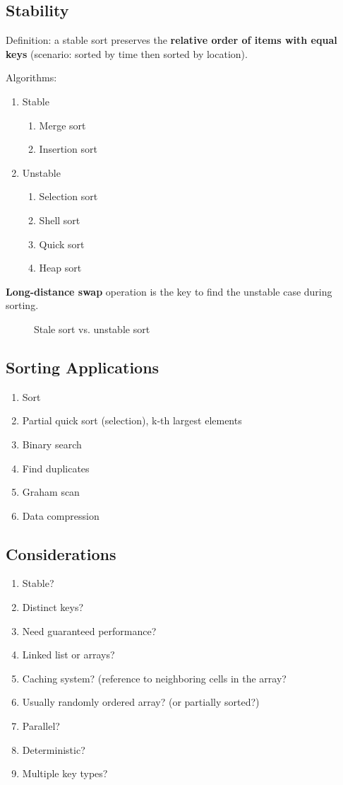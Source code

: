 \subsection{Stability}
Definition: a stable sort preserves the \textbf{relative order of items with equal keys} (scenario: sorted by time then sorted by location). 

Algorithms:
\begin{enumerate}
\item Stable
\begin{enumerate}
\item Merge sort
\item Insertion sort
\end{enumerate} 
\item Unstable
\begin{enumerate}
\item Selection sort
\item Shell sort
\item Quick sort
\item Heap sort
\end{enumerate}
\end{enumerate}
\textbf{Long-distance swap} operation is the key to find the unstable case during sorting. 
\begin{figure}[hbtp]
\centering
{}
\caption{Stale sort vs. unstable sort}
\label{fig:trie} 
\end{figure}

\subsection{Sorting Applications}
\begin{enumerate}
\item Sort
\item Partial quick sort (selection), k-th largest elements 
\item Binary search
\item Find duplicates 
\item Graham scan
\item Data compression
\end{enumerate}

\subsection{Considerations}
\begin{enumerate}
\item Stable?
\item Distinct keys?
\item Need guaranteed performance?
\item Linked list or arrays?
\item Caching system? (reference to neighboring cells in the array? 
\item Usually randomly ordered array?
(or partially sorted?)\item Parallel?
\item Deterministic?
\item Multiple key types?
\end{enumerate}

